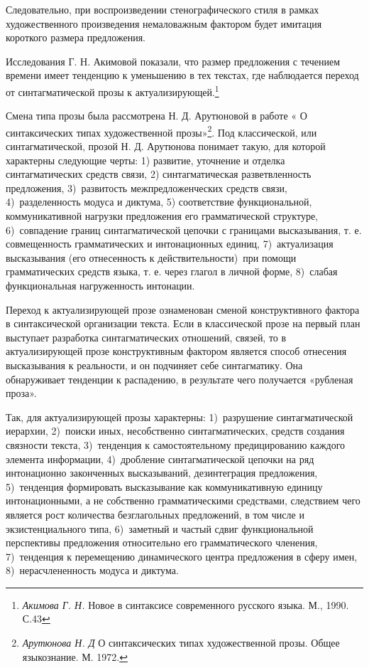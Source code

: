 \documentclass{kursa4}
\begin{document}
      Следовательно, при воспроизведении стенографического стиля в рамках
      художественного произведения немаловажным фактором будет имитация
      короткого размера предложения. 

      Исследования Г. Н. Акимовой показали, что размер предложения с
      течением времени имеет тенденцию к уменьшению в тех текстах, где
      наблюдается переход от синтагматической прозы к
      актуализирующей.\footnote{{
      }\textit{{Акимова Г. Н.}}{ Новое в
      синтаксисе современного русского языка. М., 1990. С.43}} 

      Смена типа прозы была рассмотрена Н. Д. Арутюновой в работе « О
      синтаксических типах художественной прозы»\footnote{{
      }\textit{{Арутюнова Н. Д}}{ О
      синтаксических типах художественной прозы. Общее языкознание. М.
      1972.}}. Под классической, или синтагматической, прозой Н. Д. Арутюнова
      понимает такую, для которой характерны следующие черты:
      1) развитие, уточнение и отделка синтагматических средств связи, 2)
      синтагматическая разветвленность предложения, 3)~развитость
      межпредложенческих средств связи, 4)~разделенность модуса и диктума, 5)
      соответствие функциональной, коммуникативной нагрузки предложения его
      грамматической структуре, 6)~совпадение границ синтагматической цепочки
      с границами высказывания, т. е. совмещенность грамматических и
      интонационных единиц, 7)~актуализация высказывания (его отнесенность к
      действительности)~при помощи грамматических средств языка, т. е. через
      глагол в личной форме, 8)~слабая функциональная нагруженность
      интонации.

      Переход к актуализирующей прозе ознаменован сменой конструктивного
      фактора в синтаксической организации текста. Если в классической прозе
      на первый план выступает разработка синтагматических отношений, связей,
      то в актуализирующей прозе конструктивным фактором является способ
      отнесения высказывания к реальности, и он подчиняет себе синтагматику.
      Она обнаруживает тенденции к распадению, в результате чего получается
      «рубленая проза». 

      Так, для актуализирующей прозы характерны:
      1)~разрушение синтагматической иерархии, 2)~поиски иных, несобственно
      синтагматических, средств создания связности текста, 3)~тенденция к
      самостоятельному предицированию каждого элемента информации, 4)~дробление синтагматической цепочки на ряд интонационно законченных
      высказываний, дезинтеграция предложения, 5)~тенденция формировать
      высказывание как коммуникативную единицу интонационными, а не
      собственно грамматическими средствами, следствием чего является рост
      количества безглагольных предложений, в том числе и экзистенциального
      типа, 6)~заметный и частый сдвиг функциональной перспективы предложения
      относительно его грамматического членения, 7)~тенденция к перемещению
      динамического центра предложения в сферу имен, 8)~нерасчлененность
      модуса и диктума.
\end{document}
